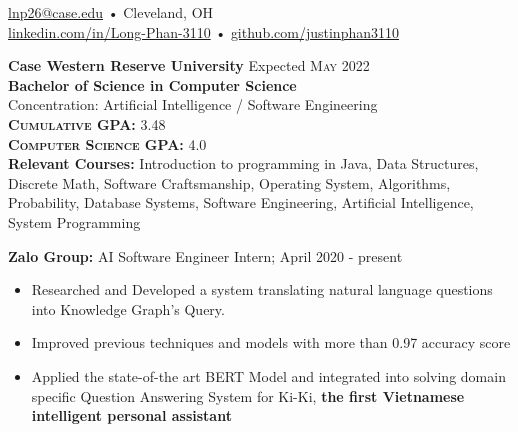 \documentclass[a4paper,11pt]{article}
\begin{document}
 
 
\begin{center} 
\href{mailto:lnp26@case.edu}{lnp26@case.edu} • Cleveland, OH \\
\href{https://linkedin.com/in/Long-Phan-3110/}{linkedin.com/in/Long-Phan-3110} • \href{http://github.com/justinphan3110}{github.com/justinphan3110}
\noindent\makebox[\linewidth]{\rule{\paperwidth}{2pt}}
\end{center}

\begin{flushleft}
	\textbf{Case Western Reserve University } \hspace{1cm} Expected \textsc{May} 2022 \\
	\textbf{Bachelor of Science in Computer Science} \\
	Concentration: Artificial Intelligence / Software Engineering \\
	\textbf{\textsc{Cumulative GPA:}} 3.48 \\
	\textbf{\textsc{Computer Science GPA:}} 4.0 \\ 
    \textbf{Relevant Courses:}  Introduction to programming in Java, Data Structures, Discrete Math, Software Craftsmanship, Operating System, Algorithms, Probability, Database Systems,  Software Engineering, Artificial Intelligence, System Programming
    		
	\centering{\noindent\makebox{\rule{8cm}{1.5pt}}}
\end{flushleft}


\begin{flushleft}
	
	\textbf{Zalo Group: } AI Software Engineer Intern; April 2020 - present \\
	\vspace{-\topsep}
	\begin{itemize}
		\setlength{\parskip}{2pt}
		\setlength{\itemsep}{0pt plus 1pt}
		\item Researched and Developed a system translating natural language questions into Knowledge Graph's Query.
		\item Improved previous techniques and models with more than 0.97 accuracy score
		\item Applied the state-of-the art BERT Model and integrated into solving
		domain specific Question Answering System for Ki-Ki, \textbf{the first Vietnamese intelligent personal assistant} 
	\end{itemize}
	\vspace{-\topsep}

\end{flushleft} 
\end{document}
